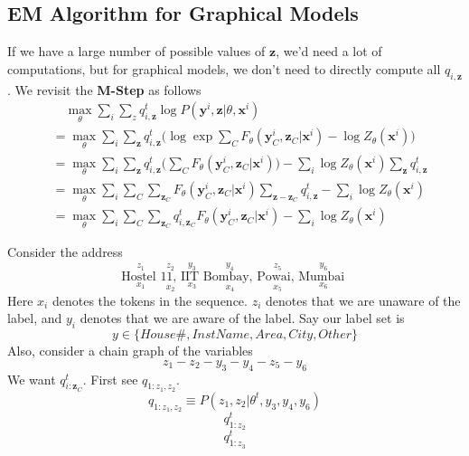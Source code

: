 \subsection{EM Algorithm for Graphical Models}
If we have a large number of possible values of $\mathbf z$, we'd need a lot of computations, but for graphical models, we don't need to directly compute all $q_{i, \mathbf z}$. We revisit the \textbf{M-Step} as follows
\begin{align*}
&\quad\max_{\theta}\sum_i \sum_z q_{i, \mathbf z}^t \log P(\mathbf y^i, \mathbf z|\theta, \mathbf x^i) \\
&= \max_\theta \sum_i\sum_\mathbf{z} q_{i, \mathbf z}^t \bigg(\log \exp\sum_C F_\theta(\mathbf y_C^i, \mathbf z_C| \mathbf x^i) - \log Z_\theta(\mathbf x^i)\bigg) \\
&= \max_\theta  \sum_i\sum_\mathbf{z} q_{i, \mathbf z}^t\bigg(\sum_C F_\theta(\mathbf y_C^i, \mathbf z_C| \mathbf x^i)\bigg) - \sum_i\log Z_\theta(\mathbf x^i) \sum_\mathbf{z} q_{i, \mathbf z}^t  \\
&=\max_\theta \sum_i \sum_C \sum_{\mathbf z_C} F_\theta(\mathbf y_C^i, \mathbf z_C| \mathbf x^i)\sum_{\mathbf{z-z}_C} q_{i, \mathbf z}^t - \sum_i \log Z_\theta(\mathbf x^i) \\
&=\max_\theta \sum_i \sum_C \sum_{\mathbf z_C} q_{i, \mathbf z_C}^tF_\theta(\mathbf y_C^i, \mathbf z_C| \mathbf x^i) - \sum_i \log Z_\theta(\mathbf x^i)
\end{align*}
\begin{exmp}
Consider the address
\[
\underset{x_1}{\overset{z_1}{\text{Hostel }}}
\underset{x_2}{\overset{z_2}{\text{11, }}}
\underset{x_3}{\overset{y_3}{\text{IIT }}}
\underset{x_4}{\overset{y_4}{\text{Bombay, }}}
\underset{x_5}{\overset{z_5}{\text{Powai, }}}
\underset{x_6}{\overset{y_6}{\text{Mumbai }}}
\]
Here $x_i$ denotes the tokens in the sequence. $z_i$ denotes that we are unaware of the label, and $y_i$ denotes that we are aware of the label. Say our label set is
\[y \in \{House\#, InstName, Area, City, Other\}\]
Also, consider a chain graph of the variables
\[z_1 - z_2 - y_3 - y_4 - z_5 - y_6\]
We want $q_{i:\mathbf z_C}^t$. First see $q_{1:z_1, z_2}$.
\[
q_{1:z_1, z_2} \equiv P(z_1, z_2 | \theta^t, y_3, y_4, y_6)
\]
\[
q^t_{1:z_2}
\]
\[
q^t_{1:z_3}
\]
\end{exmp}